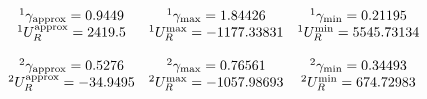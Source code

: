 \documentclass[12pt,a4paper]{article}
\newcommand{\CalcFive} [1]{\fpeval{round((#1),5)}}
\begin{document}
\begin{equation*}
    \begin{matrix}
        & ^1\gamma_\text{approx} = \GammaApproxOne 
        & ^1\gamma_\text{max} = \CalcFive{\GammaMaxOne}
        & ^1\gamma_\text{min} = \CalcFive{\GammaMinOne} \\
        & ^1U_R^\text{approx} = \URapproxOne 
        & ^1U_R^\text{max} = \CalcFive{\URMaxOne} 
        & ^1U_R^\text{min} = \CalcFive{\URMinOne} \\ \\
        & ^2\gamma_\text{approx} = \GammaApproxTwo 
        & ^2\gamma_\text{max} = \CalcFive{\GammaMaxTwo}
        & ^2\gamma_\text{min} = \CalcFive{\GammaMinTwo} \\
        & ^2U_R^\text{approx} = \URapproxTwo 
        & ^2U_R^\text{max} = \CalcFive{\URMaxTwo} 
        & ^2U_R^\text{min} = \CalcFive{\URMinTwo}
    \end{matrix}
\end{equation*}
\end{document}
